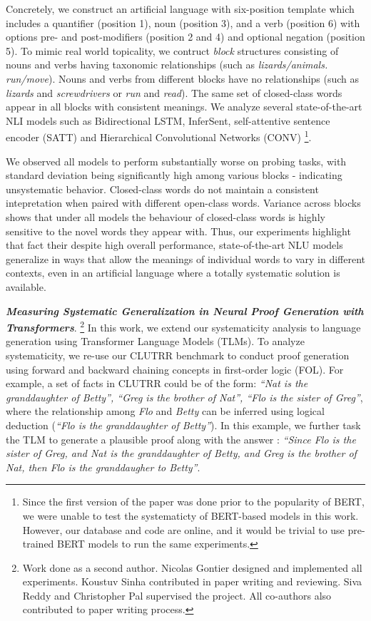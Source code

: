 \documentclass[12pt]{article}
\newcommand{\xhdr}[1]{{\noindent\bfseries #1}.}
\begin{document}
Concretely, we construct an artificial language with six-position template which includes a quantifier (position 1), noun (position 3), and a verb (position 6) with options pre- and post-modifiers (position 2 and 4) and optional negation (position 5). To mimic real world topicality, we contruct \textit{block} structures consisting of nouns and verbs having taxonomic relationships (such as \textit{lizards/animals. run/move}). Nouns and verbs from different blocks have no relationships (such as \textit{lizards} and \textit{screwdrivers} or \textit{run} and \textit{read}). The same set of closed-class words appear in all blocks with consistent meanings. We analyze several state-of-the-art NLI models such as Bidirectional LSTM, InferSent, self-attentive sentence encoder (SATT) and Hierarchical Convolutional Networks (CONV) \footnote{Since the first version of the paper was done prior to the popularity of BERT, we were unable to test the systematicty of BERT-based models in this work. However, our database and code are online, and it would be trivial to use pre-trained BERT models to run the same experiments.}.

We observed all models to perform substantially worse on probing tasks, with standard deviation being significantly high among various blocks - indicating unsystematic behavior. Closed-class words do not maintain a consistent intepretation when paired with different open-class words. Variance across blocks shows that under all models the behaviour of closed-class words is highly sensitive to the novel words they appear with. Thus, our experiments highlight that fact their despite high overall performance, state-of-the-art NLU models generalize in ways that allow the meanings of individual words to vary in different contexts, even in an artificial language where a totally systematic solution is available.

\xhdr{\textit{Measuring Systematic Generalization in Neural Proof Generation with Transformers}} \cite{gontier2020} \footnote{Work done as a second author. Nicolas Gontier designed and implemented all experiments. Koustuv Sinha contributed in paper writing and reviewing. Siva Reddy and Christopher Pal supervised the project. All co-authors also contributed to paper writing process.} In this work, we extend our systematicity analysis to language generation using Transformer Language Models (TLMs). To analyze systematicity, we re-use our CLUTRR benchmark to conduct proof generation using forward and backward chaining concepts in first-order logic (FOL). For example, a set of facts in CLUTRR could be of the form: \textit{``Nat is the granddaughter of Betty'', ``Greg is the brother of Nat'', ``Flo is the sister of Greg''}, where the relationship among \textit{Flo} and \textit{Betty} can be inferred using logical deduction (\textit{``Flo is the granddaughter of Betty''}). In this example, we further task the TLM to generate a plausible proof along with the answer : \textit{``Since Flo is the sister of Greg, and Nat is the granddaughter of Betty, and Greg is the brother of Nat, then Flo is the granddaugher to Betty''}.
\end{document}
